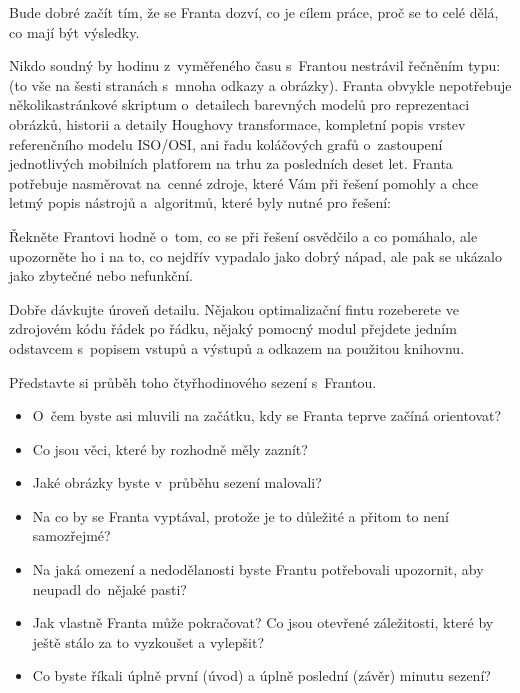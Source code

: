 Bude dobré začít tím, že se Franta dozví, co je cílem práce, proč se to celé dělá, co mají být výsledky.

Nikdo soudný by hodinu z~vyměřeného času s~Frantou nestrávil řečněním typu:  (to vše na šesti stranách s~mnoha odkazy a obrázky).
Franta obvykle nepotřebuje několikastránkové skriptum o~detailech barevných modelů pro reprezentaci obrázků, historii a detaily Houghovy transformace, kompletní popis vrstev referenčního modelu ISO/OSI, ani řadu koláčových grafů o~zastoupení jednotlivých mobilních platforem na trhu za posledních deset let.
Franta potřebuje nasměrovat na~cenné zdroje, které Vám při řešení pomohly a chce letmý popis nástrojů a~algoritmů, které byly nutné pro řešení: 

Řekněte Frantovi hodně o~tom, co se při řešení osvědčilo a co pomáhalo, ale upozorněte ho i na to, co nejdřív vypadalo jako dobrý nápad, ale pak se ukázalo jako zbytečné nebo nefunkční.

Dobře dávkujte úroveň detailu. Nějakou optimalizační fintu rozeberete ve zdrojovém kódu řádek po řádku, nějaký pomocný modul přejdete jedním odstavcem s~popisem vstupů a výstupů a odkazem na použitou knihovnu.

Představte si průběh toho čtyřhodinového sezení s~Frantou.
\begin{itemize}
  \item{O~čem byste asi mluvili na začátku, kdy se Franta teprve začíná orientovat?}
  \item{Co jsou věci, které by rozhodně měly zaznít?}
  \item{Jaké obrázky byste v~průběhu sezení malovali?}
  \item{Na co by se Franta vyptával, protože je to důležité a přitom to není samozřejmé?}
  \item{Na jaká omezení a nedodělanosti byste Frantu potřebovali upozornit, aby neupadl do~nějaké pasti?}
  \item{Jak vlastně Franta může pokračovat? Co jsou otevřené záležitosti, které by ještě stálo za to vyzkoušet a vylepšit?}
  \item{Co byste říkali úplně první (úvod) a úplně poslední (závěr) minutu sezení?}
\end{itemize}


